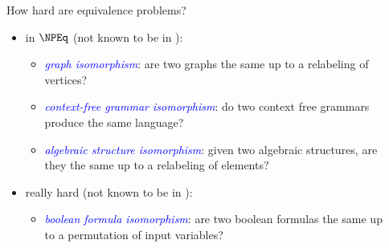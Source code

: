 \documentclass[final]{beamer}
\newcommand{\emphblue}[1]{\emph{\textcolor{blue}{#1}}}
\begin{document}
\begin{frame}{}
\begin{columns}[t]
\begin{column}{.3\linewidth}
\begin{block}{\LARGE How hard are equivalence problems?}
\begin{itemize}
\begin{itemize}
            (even or odd number of ones)?
          \item \emphblue{same bitcount}: do two strings have the same number
            of ones?
          \item \emphblue{equal or complement}: are two strings either equal or
            bitwise complements?
          \item \emphblue{tree isomorphism}: are two trees the same up to a
            relabeling of vertices?
          \end{itemize}
        \item in $\NPEq$ (not known to be in \PEq):
          \begin{itemize}\Large
          \item \emphblue{graph isomorphism}: are two graphs the same up to a
            relabeling of vertices?
          \item \emphblue{context-free grammar isomorphism}: do two context
            free grammars produce the same language?
          \item \emphblue{algebraic structure isomorphism}: given two algebraic
            structures, are they the same up to a relabeling of elements?
          \end{itemize}
        \item really hard (not known to be in \NPEq):
          \begin{itemize}\Large
          \item \emphblue{boolean formula isomorphism}: are two boolean
            formulas the same up to a permutation of input variables?
          \end{itemize}
        \end{itemize}
      \end{block}

    \end{column}

    \begin{column}{.3\linewidth}


\end{column}
\end{columns}
\end{frame}
\end{document}
